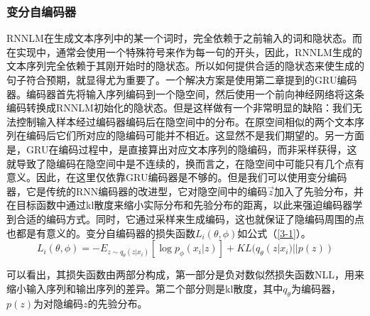 \subsubsection{变分自编码器}
RNNLM在生成文本序列中的某一个词时，完全依赖于之前输入的词和隐状态。而在实现中，通常会使用一个特殊符号来作为每一句的开头，因此，RNNLM生成的文本序列完全依赖于其刚开始时的隐状态。所以如何提供合适的隐状态来使生成的句子符合预期，就显得尤为重要了。一个解决方案是使用第二章提到的GRU编码器。编码器首先将输入序列编码到一个隐空间，然后使用一个前向神经网络将这条编码转换成RNNLM初始化的隐状态。但是这样做有一个非常明显的缺陷：我们无法控制输入样本经过编码器编码后在隐空间中的分布。在原空间相似的两个文本序列在编码后它们所对应的隐编码可能并不相近。这显然不是我们期望的。另一方面是，GRU在编码过程中，是直接算出对应文本序列的隐编码，而非采样获得，这就导致了隐编码在隐空间中是不连续的，换而言之，在隐空间中可能只有几个点有意义。因此，在这里仅依靠GRU编码器是不够的。但是我们可以使用变分编码器，它是传统的RNN编码器的改进型，它对隐空间中的编码\(\overrightarrow{z}\)加入了先验分布，并在目标函数中通过kl散度来缩小实际分布和先验分布的距离，以此来强迫编码器学到合适的编码方式。同时，它通过采样来生成编码，这也就保证了隐编码周围的点也都是有意义的。变分自编码器的损失函数$L_i(\theta,\phi)$如公式（\ref{3-1}）。
\begin{equation}\label{3-1}
    L_i(\theta,\phi)=-E_{z\sim q_\theta(z|x_i)}[\log p_\phi(x_i|z)]+KL (q_\theta(z|x_i)||p(z))
\end{equation}

可以看出，其损失函数由两部分构成，第一部分是负对数似然损失函数NLL，用来缩小输入序列和输出序列的差异。第二个部分则是kl散度，其中$q_\theta$为编码器，$p(z)$为对隐编码$z$的先验分布。


